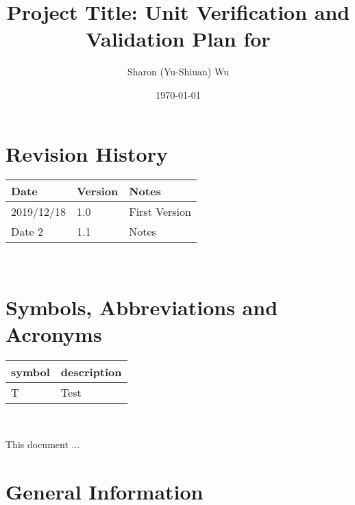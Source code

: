 \documentclass[12pt, titlepage]{article}
\begin{document}
\title{Project Title: Unit Verification and Validation Plan for \progname{}} 
\author{Sharon (Yu-Shiuan) Wu}
\date{\today}
	
\maketitle


\section{Revision History}

\begin{tabularx}{\textwidth}{p{3cm}p{2cm}X}
\toprule {\bf Date} & {\bf Version} & {\bf Notes}\\
\midrule
2019/12/18 & 1.0 & First Version\\
Date 2 & 1.1 & Notes\\
\bottomrule
\end{tabularx}

~\newpage

\tableofcontents

\listoftables


\listoffigures


\newpage

\section{Symbols, Abbreviations and Acronyms}

\renewcommand{\arraystretch}{1.2}
\begin{tabular}{l l} 
  \toprule		
  \textbf{symbol} & \textbf{description}\\
  \midrule 
  T & Test\\
  \bottomrule
\end{tabular}\\


\newpage


This document ... 

\section{General Information}
\end{document}
